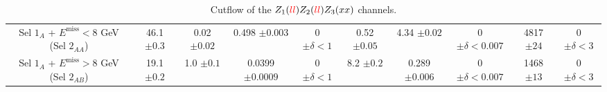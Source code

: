 \documentclass[a4paper,11pt]{article}
\begin{document}
\begin{table}[h!]
\begin{adjustbox}{width=1\textwidth}
\begin{tabular}{|c|c|c|c|c|c|c|c|c|c|}
            \thead{Sel $1_A$ + $E^{\mbox{miss}}<8$ GeV \\ (Sel $2_{AA}$)} & \thead{46.1\\$\pm0.3$} & \thead{0.02\\$\pm0.02$} & \thead{0.498\\$\pm0.003$} & \thead{0\\$\pm\delta<1$} & \thead{0.52\\$\pm0.05$} & \thead{4.34\\$\pm0.02$} & \thead{0\\$\pm\delta<0.007$} & \thead{4817\\$\pm24$} & \thead{0\\$\pm\delta<3$} \\
            \thead{Sel $1_A$ + $E^{\mbox{miss}}>8$ GeV \\ (Sel $2_{AB}$)} & \thead{19.1\\$\pm0.2$} & \thead{1.0\\$\pm0.1$} & \thead{0.0399\\$\pm0.0009$} & \thead{0\\$\pm\delta<1$} & \thead{8.2\\$\pm0.2$} & \thead{0.289\\$\pm0.006$} & \thead{0\\$\pm\delta<0.007$} & \thead{1468\\$\pm13$} & \thead{0\\$\pm\delta<3$} \\
            \hline
        \end{tabular}
        \end{adjustbox}
        \caption[Cutflow of the $Z_1(\textcolor{red}{ll})Z_2(\textcolor{red}{ll})Z_3(xx)$ channels.]%
        {Cutflow of the $Z_1(\textcolor{red}{ll})Z_2(\textcolor{red}{ll})Z_3(xx)$ channels.}
        \label{Cutflowllllxx}
    \end{table}
\end{document}
